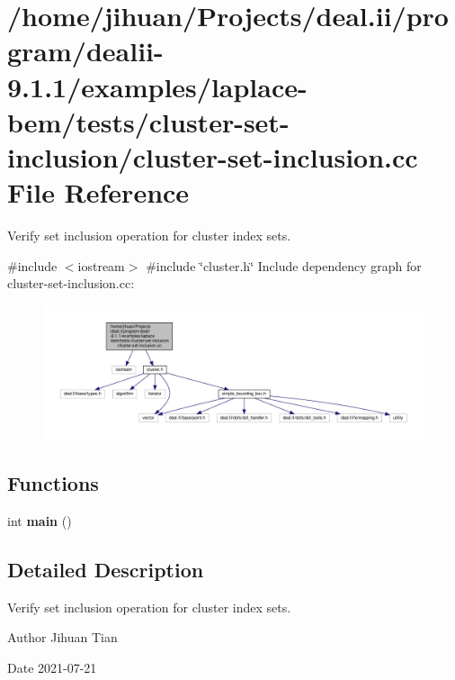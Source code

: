 \hypertarget{cluster-set-inclusion_8cc}{}\section{/home/jihuan/\+Projects/deal.ii/program/dealii-\/9.1.1/examples/laplace-\/bem/tests/cluster-\/set-\/inclusion/cluster-\/set-\/inclusion.cc File Reference}
\label{cluster-set-inclusion_8cc}


Verify set inclusion operation for cluster index sets.  


{\ttfamily \#include $<$iostream$>$}\newline
{\ttfamily \#include \char`\"{}cluster.\+h\char`\"{}}\newline
Include dependency graph for cluster-\/set-\/inclusion.cc\+:\nopagebreak
\begin{figure}[H]
\begin{center}
\leavevmode
\includegraphics[width=350pt]{cluster-set-inclusion_8cc__incl}
\end{center}
\end{figure}
\subsection*{Functions}
\begin{DoxyCompactItemize}
\item 
\mbox{\label{cluster-set-inclusion_8cc_ae66f6b31b5ad750f1fe042a706a4e3d4}} 
int {\bfseries main} ()
\end{DoxyCompactItemize}


\subsection{Detailed Description}
Verify set inclusion operation for cluster index sets. 

\begin{DoxyAuthor}{Author}
Jihuan Tian 
\end{DoxyAuthor}
\begin{DoxyDate}{Date}
2021-\/07-\/21 
\end{DoxyDate}
